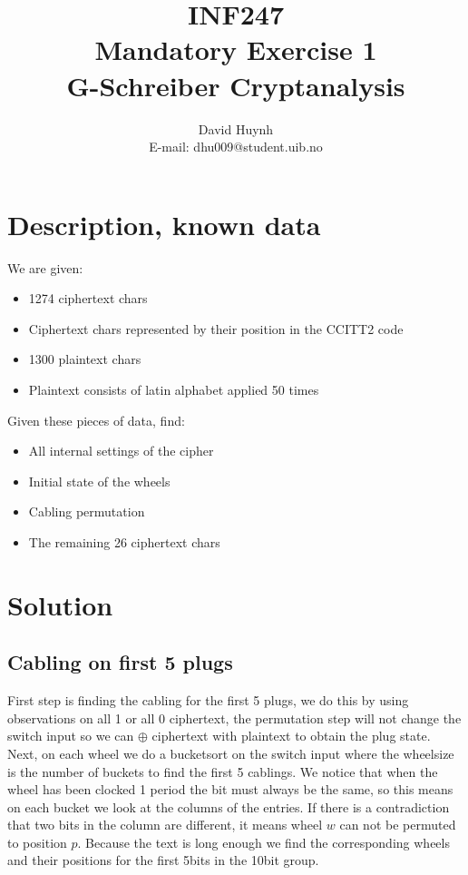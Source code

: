 \documentclass{article}
\begin{document}
\title{INF247\\ Mandatory Exercise 1\\ G-Schreiber Cryptanalysis}
\author{David Huynh\\ E-mail: dhu009@student.uib.no}
\date{}

\maketitle

\section{Description, known data}

We are given:
\begin{itemize}
	\item 1274 ciphertext chars
	\item Ciphertext chars represented by their position in the CCITT2 code
	\item 1300 plaintext chars
	\item Plaintext consists of latin alphabet applied 50 times
\end{itemize}

Given these pieces of data, find:
\begin{itemize}
	\item All internal settings of the cipher
	\item Initial state of the wheels
	\item Cabling permutation
	\item The remaining 26 ciphertext chars
\end{itemize}

\section{Solution}

\subsection*{Cabling on first 5 plugs}

First step is finding the cabling for the first 5 plugs, we do this by using observations on all 1 or all 0 ciphertext, the permutation step will not change the switch input so we can $\oplus$ ciphertext with plaintext to obtain the plug state.\\
Next, on each wheel we do a bucketsort on the switch input where the wheelsize is the number of buckets to find the first 5 cablings. We notice that when the wheel has been clocked 1 period the bit must always be the same, so this means on each bucket we look at the columns of the entries. If there is a contradiction that two bits in the column are different, it means wheel $w$ can not be permuted to position $p$. Because the text is long enough we find the corresponding wheels and their positions for the first 5bits in the 10bit group.
\end{document}
